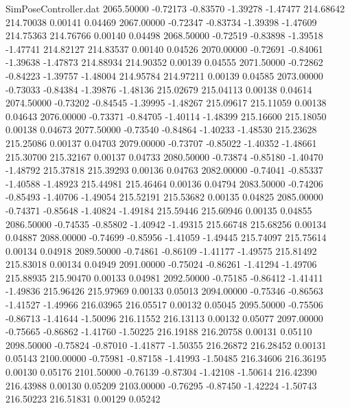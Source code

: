 \begin{filecontents}{SimPoseController.dat}
2065.50000   -0.72173   -0.83570    -1.39278   -1.47477  214.68642  214.70038    0.00141    0.04469
2067.00000   -0.72347   -0.83734    -1.39398   -1.47609  214.75363  214.76766    0.00140    0.04498
2068.50000   -0.72519   -0.83898    -1.39518   -1.47741  214.82127  214.83537    0.00140    0.04526
2070.00000   -0.72691   -0.84061    -1.39638   -1.47873  214.88934  214.90352    0.00139    0.04555
2071.50000   -0.72862   -0.84223    -1.39757   -1.48004  214.95784  214.97211    0.00139    0.04585
2073.00000   -0.73033   -0.84384    -1.39876   -1.48136  215.02679  215.04113    0.00138    0.04614
2074.50000   -0.73202   -0.84545    -1.39995   -1.48267  215.09617  215.11059    0.00138    0.04643
2076.00000   -0.73371   -0.84705    -1.40114   -1.48399  215.16600  215.18050    0.00138    0.04673
2077.50000   -0.73540   -0.84864    -1.40233   -1.48530  215.23628  215.25086    0.00137    0.04703
2079.00000   -0.73707   -0.85022    -1.40352   -1.48661  215.30700  215.32167    0.00137    0.04733
2080.50000   -0.73874   -0.85180    -1.40470   -1.48792  215.37818  215.39293    0.00136    0.04763
2082.00000   -0.74041   -0.85337    -1.40588   -1.48923  215.44981  215.46464    0.00136    0.04794
2083.50000   -0.74206   -0.85493    -1.40706   -1.49054  215.52191  215.53682    0.00135    0.04825
2085.00000   -0.74371   -0.85648    -1.40824   -1.49184  215.59446  215.60946    0.00135    0.04855
2086.50000   -0.74535   -0.85802    -1.40942   -1.49315  215.66748  215.68256    0.00134    0.04887
2088.00000   -0.74699   -0.85956    -1.41059   -1.49445  215.74097  215.75614    0.00134    0.04918
2089.50000   -0.74861   -0.86109    -1.41177   -1.49575  215.81492  215.83018    0.00134    0.04949
2091.00000   -0.75024   -0.86261    -1.41294   -1.49706  215.88935  215.90470    0.00133    0.04981
2092.50000   -0.75185   -0.86412    -1.41411   -1.49836  215.96426  215.97969    0.00133    0.05013
2094.00000   -0.75346   -0.86563    -1.41527   -1.49966  216.03965  216.05517    0.00132    0.05045
2095.50000   -0.75506   -0.86713    -1.41644   -1.50096  216.11552  216.13113    0.00132    0.05077
2097.00000   -0.75665   -0.86862    -1.41760   -1.50225  216.19188  216.20758    0.00131    0.05110
2098.50000   -0.75824   -0.87010    -1.41877   -1.50355  216.26872  216.28452    0.00131    0.05143
2100.00000   -0.75981   -0.87158    -1.41993   -1.50485  216.34606  216.36195    0.00130    0.05176
2101.50000   -0.76139   -0.87304    -1.42108   -1.50614  216.42390  216.43988    0.00130    0.05209
2103.00000   -0.76295   -0.87450    -1.42224   -1.50743  216.50223  216.51831    0.00129    0.05242

\end{filecontents}
